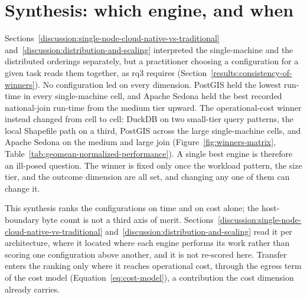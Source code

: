 \section{Synthesis: which engine, and when}
\label{discussion:synthesis-which-engine-when}

Sections~\ref{discussion:single-node-cloud-native-vs-traditional} and~\ref{discussion:distribution-and-scaling} interpreted the single-machine and the distributed orderings separately, but a practitioner choosing a configuration for a given task reads them together, as \acrshort{rq}3 requires (Section~\ref{results:consistency-of-winners}). No configuration led on every dimension. PostGIS held the lowest run-time in every single-machine cell, and Apache Sedona held the best recorded national-join run-time from the medium tier upward. The operational-cost winner instead changed from cell to cell: DuckDB on two small-tier query patterns, the local Shapefile path on a third, PostGIS across the large single-machine cells, and Apache Sedona on the medium and large join (Figure~\ref{fig:winners-matrix}, Table~\ref{tab:geomean-normalized-performance}). A single best engine is therefore an ill-posed question. The winner is fixed only once the workload pattern, the size tier, and the outcome dimension are all set, and changing any one of them can change it.

This synthesis ranks the configurations on time and on cost alone; the host-boundary byte count is not a third axis of merit. Sections~\ref{discussion:single-node-cloud-native-vs-traditional} and~\ref{discussion:distribution-and-scaling} read it per architecture, where it located where each engine performs its work rather than scoring one configuration above another, and it is not re-scored here. Transfer enters the ranking only where it reaches operational cost, through the egress term of the cost model (Equation~\ref{eq:cost-model}), a contribution the cost dimension already carries.

